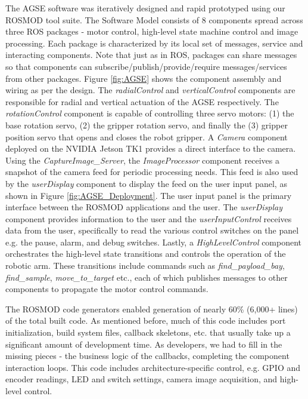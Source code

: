The AGSE software was iteratively designed and rapid prototyped using
our ROSMOD tool suite. The Software Model consists of 8 components
spread across three ROS packages - motor control, high-level state
machine control and image processing. Each package is characterized by
its local set of messages, service and interacting components. Note
that just as in ROS, packages can share messages so that components
can subscribe/publish/provide/require messages/services from other
packages. Figure \ref{fig:AGSE} shows the component assembly and
wiring as per the design. The \emph{radialControl} and
\emph{verticalControl} components are responsible for radial and
vertical actuation of the AGSE respectively. The
\emph{rotationControl} component is capable of controlling three servo
motors: (1) the base rotation servo, (2) the gripper rotation servo,
and finally the (3) gripper position servo that opens and closes the
robot gripper. A \emph{Camera} component deployed on the NVIDIA Jetson
TK1 provides a direct interface to the camera. Using the
\emph{CaptureImage\_Server}, the \emph{ImageProcessor} component
receives a snapshot of the camera feed for periodic processing
needs. This feed is also used by the \emph{userDisplay} component to
display the feed on the user input panel, as shown in Figure
\ref{fig:AGSE_Deployment}. The user input panel is the primary
interface between the ROSMOD applications and the user. The
\emph{userDisplay} component provides information to the user and the
\emph{userInputControl} receives data from the user, specifically to
read the various control switches on the panel e.g. the pause, alarm,
and debug switches. Lastly, a \emph{HighLevelControl} component
orchestrates the high-level state transitions and controls the
operation of the robotic arm. These transitions include commands such
as \emph{find\_payload\_bay}, \emph{find\_sample},
\emph{move\_to\_target} etc., each of which publishes messages to
other components to propagate the motor control commands.

The ROSMOD code generators enabled generation of nearly 60\% (6,000+
lines) of the total built code. As mentioned before, much of this code
includes port initialization, build system files, callback skeletons,
etc. that usually take up a significant amount of development time. As
developers, we had to fill in the missing pieces - the business logic
of the callbacks, completing the component interaction loops. This
code includes architecture-specific control, e.g. GPIO and encoder
readings, LED and switch settings, camera image acquisition, and
high-level control.


